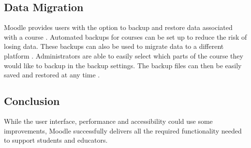 \subsection{Data Migration}
Moodle provides users with the option to backup and restore data associated with a course \cite{moodleBackupAndRestore}.
Automated backups for courses can be set up to reduce the risk of losing data.
These backups can also be used to migrate data to a different platform \cite{moodleBackup}.
Administrators are able to easily select which parts of the course they would like to backup in the backup settings.
The backup files can then be easily saved and restored at any time \cite{moodleRestore}. 

\subsection{Conclusion}
While the user interface, performance and accessibility could use some improvements, Moodle successfully delivers all the required functionality needed to support students and educators.